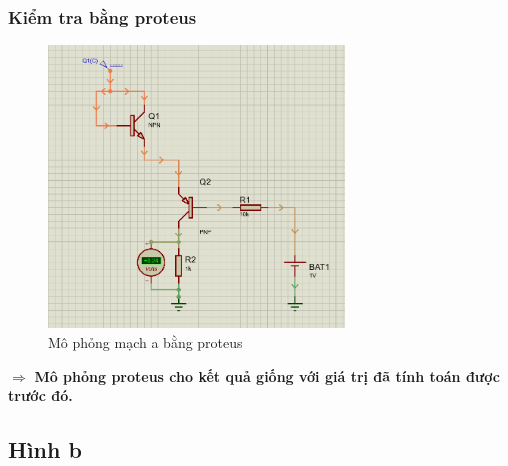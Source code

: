     \subsubsection{Kiểm tra bằng proteus}
    \begin{figure}[H]
        \centering
        \includegraphics[width=0.7\textwidth]{pictures/result5_a.png}
        \caption{Mô phỏng mạch a bằng proteus}
    \end{figure}
    $\Rightarrow$ \textbf{Mô phỏng proteus cho kết quả giống với giá trị đã tính toán được trước đó.}\\
    \cleardoublepage
    \subsection{Hình b}
